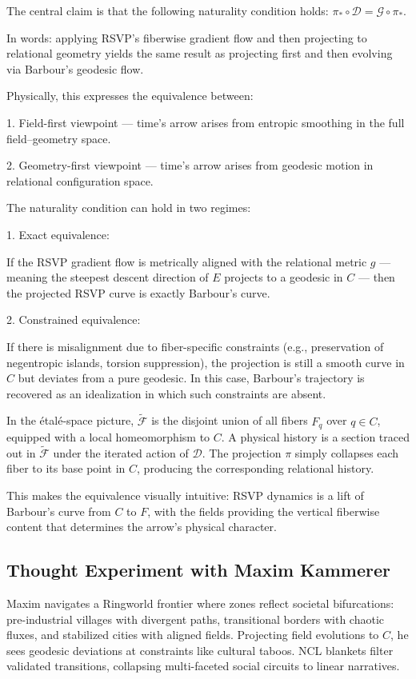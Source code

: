 \documentclass[11pt]{article}
\theoremstyle{plain}
\theoremstyle{definition}
\begin{document}
The central claim is that the following naturality condition holds:
$\pi_* \circ \mathcal{D} = \mathcal{G} \circ \pi_*$.

In words: applying RSVP’s fiberwise gradient flow and then projecting to relational geometry yields the same result as projecting first and then evolving via Barbour’s geodesic flow.

Physically, this expresses the equivalence between:

1. Field-first viewpoint — time’s arrow arises from entropic smoothing in the full field–geometry space.

2. Geometry-first viewpoint — time’s arrow arises from geodesic motion in relational configuration space.

The naturality condition can hold in two regimes:

1. Exact equivalence:

   If the RSVP gradient flow is metrically aligned with the relational metric $g$ — meaning the steepest descent direction of $E$ projects to a geodesic in $C$ — then the projected RSVP curve is exactly Barbour’s curve.

2. Constrained equivalence:

   If there is misalignment due to fiber-specific constraints (e.g., preservation of negentropic islands, torsion suppression), the projection is still a smooth curve in $C$ but deviates from a pure geodesic. In this case, Barbour’s trajectory is recovered as an idealization in which such constraints are absent.

In the étalé-space picture, $\widetilde{\mathscr{F}}$ is the disjoint union of all fibers $F_q$ over $q \in C$, equipped with a local homeomorphism to $C$. A physical history is a section traced out in $\widetilde{\mathscr{F}}$ under the iterated action of $\mathcal{D}$. The projection $\pi$ simply collapses each fiber to its base point in $C$, producing the corresponding relational history.

This makes the equivalence visually intuitive: RSVP dynamics is a lift of Barbour’s curve from $C$ to $F$, with the fields providing the vertical fiberwise content that determines the arrow’s physical character.

\subsection{Thought Experiment with Maxim Kammerer}
Maxim navigates a Ringworld frontier where zones reflect societal bifurcations: pre-industrial villages with divergent paths, transitional borders with chaotic fluxes, and stabilized cities with aligned fields. Projecting field evolutions to $C$, he sees geodesic deviations at constraints like cultural taboos. NCL blankets filter validated transitions, collapsing multi-faceted social circuits to linear narratives.
\end{document}
